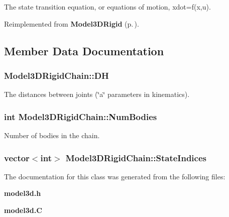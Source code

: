 The state transition equation, or equations of motion, xdot=f(x,u).



Reimplemented from {\bf Model3DRigid} {\rm (p.\,\pageref{classModel3DRigid_a3})}.

\subsection{Member Data Documentation}
\subsubsection{ Model3DRigid\-Chain::DH}\label{classModel3DRigidChain_m1}


The distances between joints (\char`\"{}a\char`\"{} parameters in kinematics).

\subsubsection{\setlength{\rightskip}{0pt plus 5cm}int Model3DRigid\-Chain::Num\-Bodies}\label{classModel3DRigidChain_m0}


Number of bodies in the chain.

\subsubsection{\setlength{\rightskip}{0pt plus 5cm}vector$<$int$>$ Model3DRigid\-Chain::State\-Indices}\label{classModel3DRigidChain_m2}




The documentation for this class was generated from the following files:\begin{CompactItemize}
\item 
{\bf model3d.h}\item 
{\bf model3d.C}\end{CompactItemize}
